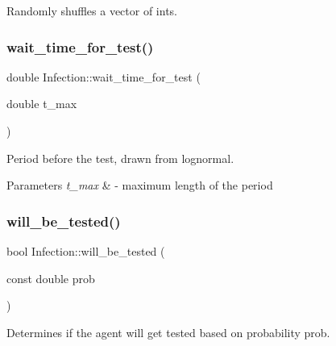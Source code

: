 Randomly shuffles a vector of ints. 

\mbox{\label{classInfection_a9047e5efaf7f6582e857d63df5813f8f}} 
\subsubsection{\texorpdfstring{wait\+\_\+time\+\_\+for\+\_\+test()}{wait\_time\_for\_test()}}
{\footnotesize\ttfamily double Infection\+::wait\+\_\+time\+\_\+for\+\_\+test (\begin{DoxyParamCaption}\item[{double}]{t\+\_\+max }\end{DoxyParamCaption})}



Period before the test, drawn from lognormal. 


\begin{DoxyParams}{Parameters}
{\em t\+\_\+max} & -\/ maximum length of the period \\
\hline
\end{DoxyParams}
\mbox{\label{classInfection_a7bffd45c44c33bbd62d2dcf4c2db380c}} 
\subsubsection{\texorpdfstring{will\+\_\+be\+\_\+tested()}{will\_be\_tested()}}
{\footnotesize\ttfamily bool Infection\+::will\+\_\+be\+\_\+tested (\begin{DoxyParamCaption}\item[{const double}]{prob }\end{DoxyParamCaption})}



Determines if the agent will get tested based on probability prob. 

\mbox{\label{classInfection_adbedec09bbbb05f1734f34c4ec4e667d}} 
